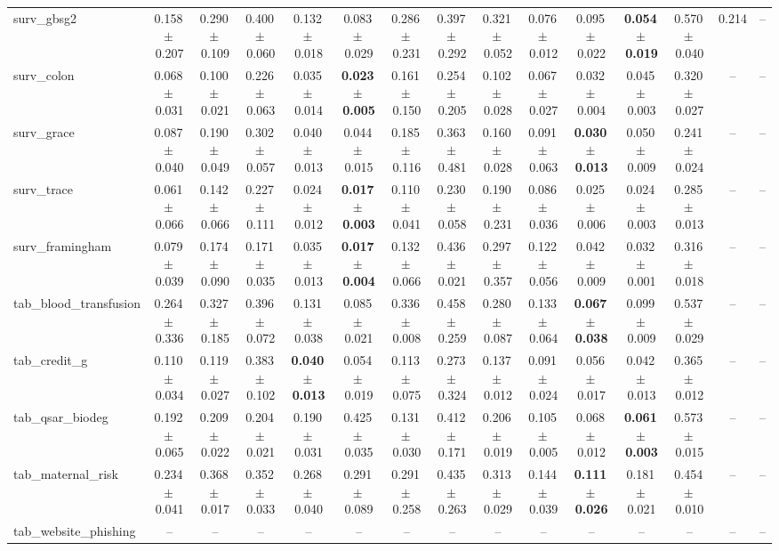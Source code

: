 \documentclass[8pt]{extarticle}
\begin{document}
\begin{longtable}{l*{14}{c}}
surv\_gbsg2 & 0.158\,$\pm$\,0.207 & 0.290\,$\pm$\,0.109 & 0.400\,$\pm$\,0.060 & 0.132\,$\pm$\,0.018 & 0.083\,$\pm$\,0.029 & 0.286\,$\pm$\,0.231 & 0.397\,$\pm$\,0.292 & 0.321\,$\pm$\,0.052 & 0.076\,$\pm$\,0.012 & 0.095\,$\pm$\,0.022 & \textbf{0.054\,$\pm$\,0.019} & 0.570\,$\pm$\,0.040 & 0.214 & -- \\
surv\_colon & 0.068\,$\pm$\,0.031 & 0.100\,$\pm$\,0.021 & 0.226\,$\pm$\,0.063 & 0.035\,$\pm$\,0.014 & \textbf{0.023\,$\pm$\,0.005} & 0.161\,$\pm$\,0.150 & 0.254\,$\pm$\,0.205 & 0.102\,$\pm$\,0.028 & 0.067\,$\pm$\,0.027 & 0.032\,$\pm$\,0.004 & 0.045\,$\pm$\,0.003 & 0.320\,$\pm$\,0.027 & -- & -- \\
surv\_grace & 0.087\,$\pm$\,0.040 & 0.190\,$\pm$\,0.049 & 0.302\,$\pm$\,0.057 & 0.040\,$\pm$\,0.013 & 0.044\,$\pm$\,0.015 & 0.185\,$\pm$\,0.116 & 0.363\,$\pm$\,0.481 & 0.160\,$\pm$\,0.028 & 0.091\,$\pm$\,0.063 & \textbf{0.030\,$\pm$\,0.013} & 0.050\,$\pm$\,0.009 & 0.241\,$\pm$\,0.024 & -- & -- \\
surv\_trace & 0.061\,$\pm$\,0.066 & 0.142\,$\pm$\,0.066 & 0.227\,$\pm$\,0.111 & 0.024\,$\pm$\,0.012 & \textbf{0.017\,$\pm$\,0.003} & 0.110\,$\pm$\,0.041 & 0.230\,$\pm$\,0.058 & 0.190\,$\pm$\,0.231 & 0.086\,$\pm$\,0.036 & 0.025\,$\pm$\,0.006 & 0.024\,$\pm$\,0.003 & 0.285\,$\pm$\,0.013 & -- & -- \\
surv\_framingham & 0.079\,$\pm$\,0.039 & 0.174\,$\pm$\,0.090 & 0.171\,$\pm$\,0.035 & 0.035\,$\pm$\,0.013 & \textbf{0.017\,$\pm$\,0.004} & 0.132\,$\pm$\,0.066 & 0.436\,$\pm$\,0.021 & 0.297\,$\pm$\,0.357 & 0.122\,$\pm$\,0.056 & 0.042\,$\pm$\,0.009 & 0.032\,$\pm$\,0.001 & 0.316\,$\pm$\,0.018 & -- & -- \\
tab\_blood\_transfusion & 0.264\,$\pm$\,0.336 & 0.327\,$\pm$\,0.185 & 0.396\,$\pm$\,0.072 & 0.131\,$\pm$\,0.038 & 0.085\,$\pm$\,0.021 & 0.336\,$\pm$\,0.008 & 0.458\,$\pm$\,0.259 & 0.280\,$\pm$\,0.087 & 0.133\,$\pm$\,0.064 & \textbf{0.067\,$\pm$\,0.038} & 0.099\,$\pm$\,0.009 & 0.537\,$\pm$\,0.029 & -- & -- \\
tab\_credit\_g & 0.110\,$\pm$\,0.034 & 0.119\,$\pm$\,0.027 & 0.383\,$\pm$\,0.102 & \textbf{0.040\,$\pm$\,0.013} & 0.054\,$\pm$\,0.019 & 0.113\,$\pm$\,0.075 & 0.273\,$\pm$\,0.324 & 0.137\,$\pm$\,0.012 & 0.091\,$\pm$\,0.024 & 0.056\,$\pm$\,0.017 & 0.042\,$\pm$\,0.013 & 0.365\,$\pm$\,0.012 & -- & -- \\
tab\_qsar\_biodeg & 0.192\,$\pm$\,0.065 & 0.209\,$\pm$\,0.022 & 0.204\,$\pm$\,0.021 & 0.190\,$\pm$\,0.031 & 0.425\,$\pm$\,0.035 & 0.131\,$\pm$\,0.030 & 0.412\,$\pm$\,0.171 & 0.206\,$\pm$\,0.019 & 0.105\,$\pm$\,0.005 & 0.068\,$\pm$\,0.012 & \textbf{0.061\,$\pm$\,0.003} & 0.573\,$\pm$\,0.015 & -- & -- \\
tab\_maternal\_risk & 0.234\,$\pm$\,0.041 & 0.368\,$\pm$\,0.017 & 0.352\,$\pm$\,0.033 & 0.268\,$\pm$\,0.040 & 0.291\,$\pm$\,0.089 & 0.291\,$\pm$\,0.258 & 0.435\,$\pm$\,0.263 & 0.313\,$\pm$\,0.029 & 0.144\,$\pm$\,0.039 & \textbf{0.111\,$\pm$\,0.026} & 0.181\,$\pm$\,0.021 & 0.454\,$\pm$\,0.010 & -- & -- \\
tab\_website\_phishing & -- & -- & -- & -- & -- & -- & -- & -- & -- & -- & -- & -- & -- & -- \\
\end{longtable}
\end{document}
